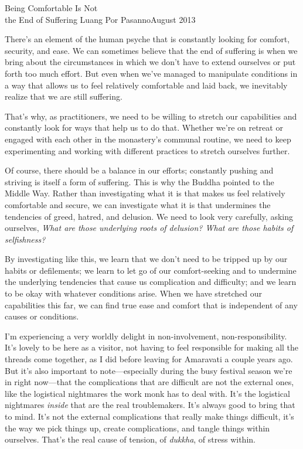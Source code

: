 {Being Comfortable Is Not\\the End of Suffering}
{Luang Por Pasanno}{August 2013}

There's an element of the human psyche that is constantly looking for 
comfort, security, and ease. We can sometimes believe that the end of 
suffering is when we bring about the circumstances in which we don't 
have to extend ourselves or put forth too much effort. But even when 
we've managed to manipulate conditions in a way that allows us to feel 
relatively comfortable and laid back, we inevitably realize that we are 
still suffering.

That's why, as practitioners, we need to be willing to stretch our 
capabilities and constantly look for ways that help us to do that. 
Whether we're on retreat or engaged with each other in the monastery's 
communal routine, we need to keep experimenting and working with 
different practices to stretch ourselves further.

Of course, there should be a balance in our efforts; constantly pushing 
and striving is itself a form of suffering. This is why the Buddha 
pointed to the Middle Way. Rather than investigating what it is that 
makes us feel relatively comfortable and secure, we can investigate 
what it is that undermines the tendencies of greed, hatred, and 
delusion. We need to look very carefully, asking ourselves, \emph{What 
are those underlying roots of delusion? What are those habits of 
selfishness?}

By investigating like this, we learn that we don't need to be tripped 
up by our habits or defilements; we learn to let go of our 
comfort-seeking and to undermine the underlying tendencies that cause 
us complication and difficulty; and we learn to be okay with whatever 
conditions arise. When we have stretched our capabilities this far, we 
can find true ease and comfort that is independent of any causes or 
conditions.


I'm experiencing a very worldly delight in non-involvement, 
non-responsibility. It's lovely to be here as a visitor, not having to 
feel responsible for making all the threads come together, as I did 
before leaving for Amaravati a couple years ago. But it's also 
important to note---especially during the busy festival season we're in 
right now---that the complications that are difficult are not the 
external ones, like the logistical nightmares the work monk has to deal 
with. It's the logistical nightmares \emph{inside} that are the real 
troublemakers. It's always good to bring that to mind. It's not the 
external complications that really make things difficult, it's the way 
we pick things up, create complications, and tangle things within 
ourselves. That's the real cause of tension, of \emph{dukkha}, of 
stress within.


